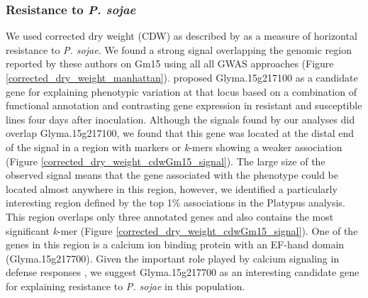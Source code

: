 \begin{figure}
\end{figure}

\subsubsection*{Resistance to \textit{P. sojae}}
\label{sv-gwas-main-results-psojae}

We used corrected dry weight (CDW) as described by \cite{deronne2022} as a
measure of horizontal resistance to \emph{P. sojae}. We found a strong signal
overlapping the genomic region reported by these authors on Gm15 using all all GWAS
approaches (Figure \ref{corrected_dry_weight_manhattan}). \cite{deronne2022}
proposed Glyma.15g217100 as a candidate gene for explaining phenotypic
variation at that locus based on a combination of functional annotation and
contrasting gene expression in resistant and susceptible lines four days after
inoculation. Although the signals found by our analyses did overlap
Glyma.15g217100, we found that this gene was located at the distal end of the signal
in a region with markers or \emph{k}-mers showing a weaker
association (Figure \ref{corrected_dry_weight_cdwGm15_signal}). The
large size of the observed signal means that the gene associated with the phenotype could
be located almost anywhere in this region, however, we identified a particularly
interesting region defined by the top 1\% associations in the Platypus
analysis. This region overlaps only three annotated genes and also contains the
most significant \emph{k}-mer (Figure
\ref{corrected_dry_weight_cdwGm15_signal}). One of the genes in this region is
a calcium ion binding protein with an EF-hand domain (Glyma.15g217700).
Given the important role played by calcium signaling in defense
responses \citep{zhang2014}, we suggest Glyma.15g217700 as an interesting
candidate gene for explaining resistance to \emph{P. sojae} in this population.

